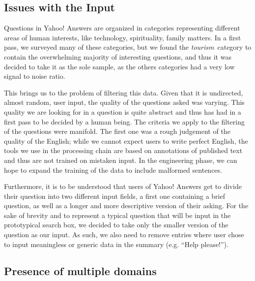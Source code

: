 

\subsection{Issues with the Input} %
\label{sub:issues_with_the_input}

Questions in Yahoo! Answers are organized in categories representing different areas of human interests, like technology, spirituality, family matters. In a first pass, we surveyed many of these categories, but we found the \emph{tourism}\ category to contain the overwhelming majority of interesting questions, and thus it was decided to take it as the sole sample, as the others categories had a very low signal to noise ratio.

This brings us to the problem of filtering this data. Given that it is undirected, almost random, user input, the quality of the questions asked was varying. This quality we are looking for in a question is quite abstract and thus has had in a first pass to be decided by a human being. The criteria we apply to the filtering of the questions were manifold. The first one was a rough judgement of the quality of the English; while we cannot expect users to write perfect English, the tools we use in the processing chain are based on annotations of published text and thus are not trained on mistaken input. In the engineering phase, we can hope to expand the training of the data to include malformed sentences.

Furthermore, it is to be understood that users of Yahoo! Answers get to divide their question into two different input fields, a first one containing a brief question, as well as a longer and more descriptive version of their asking. For the sake of brevity and to represent a typical question that will be input in the prototypical search box, we decided to take only the smaller version of the question as our input. As such, we also need to remove entries where user chose to input meaningless or generic data in the summary (e.g. ``Help please!'').


\subsection{Presence of multiple domains} %
\label{sub:presence_of_multiple_domains}

